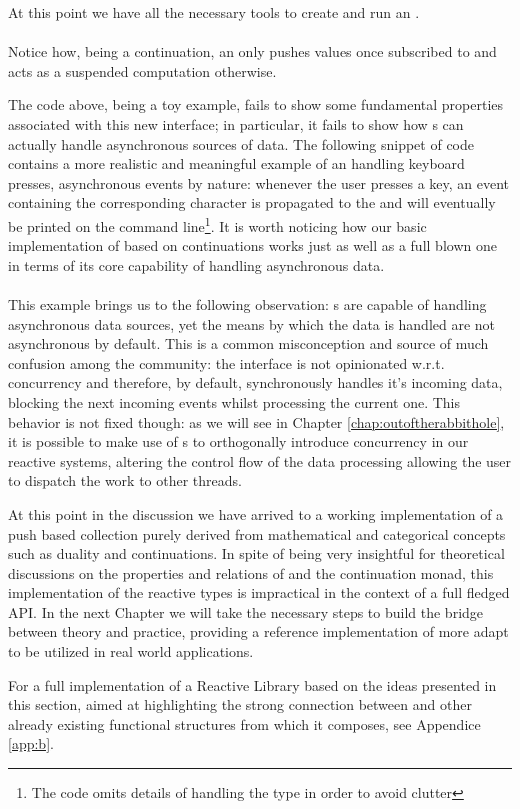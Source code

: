 At this point we have all the necessary tools to create and run an .\\

\\

Notice how, being a continuation, an  only pushes values once subscribed to and acts as a suspended computation otherwise. 

The code above, being a toy example, fails to show some fundamental properties associated with this new interface; in particular, it fails to show how s can actually handle asynchronous sources of data. The following snippet of code contains a more realistic and meaningful example of an  handling keyboard presses, asynchronous events by nature: whenever the user presses a key, an event containing the corresponding character is propagated to the  and will eventually be printed on the command line\footnote{The code omits details of handling the  type in order to avoid clutter}. It is worth noticing how our basic implementation of  based on continuations works just as well as a full blown one in terms of its core capability of handling asynchronous data.\\ 

\\

This example brings us to the following observation: s are capable of handling asynchronous data sources, yet the means by which the data is handled are not asynchronous by default. This is a common misconception and source of much confusion among the community: the  interface is not opinionated w.r.t. concurrency and therefore, by default, synchronously handles it's incoming data, blocking the next incoming events whilst processing the current one. This behavior is not fixed though: as we will see in Chapter \ref{chap:outoftherabbithole}, it is possible to make use of s to orthogonally introduce concurrency in our reactive systems, altering the control flow of the data processing allowing the user to dispatch the work to other threads.

At this point in the discussion we have arrived to a working implementation of a push based collection purely derived from mathematical and categorical concepts such as duality and continuations. In spite of being very insightful for theoretical discussions on the properties and relations of  and the continuation monad, this implementation of the reactive types is impractical in the context of a full fledged API. In the next Chapter we will take the necessary steps to build the bridge between theory and practice, providing a reference implementation of  more adapt to be utilized in real world applications.

For a full implementation of a Reactive Library based on the ideas presented in this section, aimed at highlighting the strong connection between  and other already existing functional structures from which it composes, see Appendice \ref{app:b}. 
